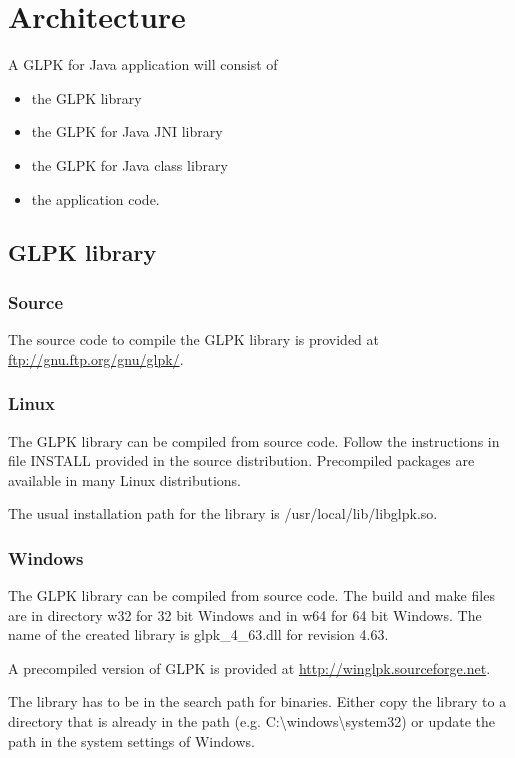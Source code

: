 \documentclass[a4paper,11pt]{report}
\newcommand{\glpkVersionMajor}{4}
\newcommand{\glpkVersionMinor}{63}
\begin{document}
\chapter{Architecture}
A GLPK for Java application will consist of
\begin{itemize}
\item the GLPK library
\item the GLPK for Java JNI library
\item the GLPK for Java class library
\item the application code.
\end{itemize}

\section{GLPK library}

\subsection{Source}
The source code to compile the GLPK library is provided at \linebreak\href{ftp://gnu.ftp.org/gnu/glpk/}{ftp://gnu.ftp.org/gnu/glpk/}.

\subsection{Linux}
The GLPK library can be compiled from source code. Follow the instructions in file INSTALL provided in the source distribution. Precompiled packages are available in many Linux distributions.

The usual installation path for the library is /usr/local/lib/libglpk.so.
\subsection{Windows}
The GLPK library can be compiled from source code. The build and make files are in directory w32 for 32 bit Windows and in w64 for 64 bit Windows. The name of the created library is glpk\_\glpkVersionMajor\_\glpkVersionMinor.dll for revision \glpkVersionMajor.\glpkVersionMinor.

A precompiled version of GLPK is provided at \href{http://winglpk.sourceforge.net}{http://winglpk.sourceforge.net}.

The library has to be in the search path for binaries. Either copy the library to a directory that is already in the path (e.g. C:\textbackslash windows\textbackslash system32) or update the path in the system settings of Windows.
\end{document}

